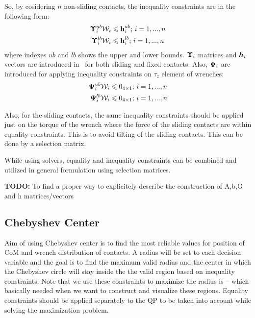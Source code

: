 \documentclass[letterpaper, 10pt, conference]{ieeeconf}
\newcommand{\TODO}[1]{{\color{red} {\bf TODO:} {#1}}}
\begin{document}
So, by cosidering $n$ non-sliding contacts, the inequality constraints are in the following form:
\begin{subequations}
\begin{align}
\bfUpsilon_{i}^{ub} \calW_i &\leqslant \textbf{h}_{i}^{ub} \text{; } i=1,...,n \\
\bfUpsilon_{i}^{lb} \calW_i &\leqslant \textbf{h}_{i}^{lb} \text{; } i=1,...,n
\end{align}
\end{subequations}
where indexes $ub$ and $lb$ shows the upper and lower bounds. $\boldsymbol{\Upsilon}_i$ matrices and $\bm{h}_i$ vectors are introduced in~\cite{Samadi2019HAL} for both sliding and fixed contacts. Also, $\boldsymbol{\Psi}_i$ are introduced for applying inequality constraints on $\tau_z$ element of wrenches:
\begin{subequations}
	\begin{align}
	\bfPsi_{i}^{ub} \calW_i &\leqslant 0_{4\times 1} \text{; } i=1,...,n \\
	\bfPsi_{i}^{lb} \calW_i &\leqslant 0_{4\times 1} \text{; } i=1,...,n
	\end{align}
\end{subequations}

Also, for the sliding contacts, the same inequality constraints should be applied just on the torque of the wrench where the force of the sliding contacts are within equality constraints. This is to avoid tilting of the sliding contacts. This can be done by a selection matrix.

While using solvers, equality and inequality constraints can be combined and utilized in general formulation using selection matrices.

\TODO{To find a proper way to explicitely describe the construction of A,b,G and h matrices/vectors}

\subsection{Chebyshev Center} \label{ChebyshevCenterSubsection}

Aim of using Chebyshev center is to find the most reliable values for position of CoM and wrench distribution of contacts. A radius will be set to each decision variable and the goal is to find the maximum valid radius and the center in which the Chebyshev circle will stay inside the the valid region based on inequality constraints. Note that we use these constraints to maximize the radius is -- which basically needed when we want to construct and visualize these regions. Equality constraints should be applied separately to the QP to be taken into account while solving the maximization problem.
\end{document}
